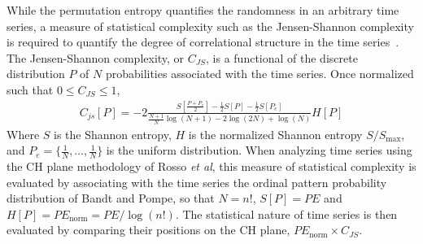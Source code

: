 \documentclass[aps,prx,twocolumn,secnumarabic,nobalancelastpage,amsmath,amssymb,
nofootinbib]{revtex4-1}
\begin{document}
While the permutation entropy quantifies the randomness in an arbitrary time series, a measure of statistical complexity such as the Jensen-Shannon complexity is required to quantify the degree of correlational structure in the time series~\cite{rosso2007}. The Jensen-Shannon complexity, or $C_{JS}$, is a functional of the discrete distribution $P$ of $N$ probabilities associated with the time series. Once normalized such that $0 \leq C_{JS} \leq 1$, 
\begin{align}
C_{js}[P] = -2\frac{S \left[ \frac{P+P_e}{2} \right] - \frac{1}{2}S[P]-\frac{1}{2}S[P_e] }{\frac{N+1}{N} \log(N+1)-2 \log(2N)+\log(N)}H[P]
\end{align}
Where $S$ is the Shannon entropy, $H$ is the normalized Shannon entropy $S/S_{\text{max}}$, and $P_e=\{\frac{1}{N}, \ldots, \frac{1}{N} \}$ is the uniform distribution. When analyzing time series using the CH plane methodology of Rosso \textit{et al}, this measure of statistical complexity is evaluated by associating with the time series the ordinal pattern probability distribution of Bandt and Pompe, so that $N=n!$, $S[P]=PE$ and $H[P]=PE_{\text{norm}}=PE/\log(n!)$. The statistical nature of time series is then evaluated by comparing their positions on the CH plane, $PE_{\text{norm}} \times C_{JS}$.
\end{document}
